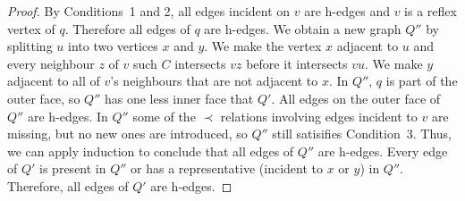 \documentclass{patmorin}
\begin{document}
\begin{proof}
   By Conditions~1 and 2, all edges incident on $v$ are h-edges and $v$
   is a reflex vertex of $q$. Therefore all edges of $q$ are h-edges.
   We obtain a new graph $Q''$ by splitting $u$ into two vertices $x$
   and $y$.  We make the vertex $x$ adjacent to $u$ and every neighbour
   $z$ of $v$ such $C$ intersects $vz$ before it intersects $vu$.  We make
   $y$ adjacent to all of $v$'s neighbours that are not adjacent to $x$.
   In $Q''$, $q$ is part of the outer face, so $Q''$ has one less inner
   face that $Q'$.  All edges on the outer face of $Q''$ are h-edges.
   In $Q''$ some of the $\prec$ relations involving edges incident
   to $v$ are missing, but no new ones are introduced, so $Q''$ still
   satisifies Condition~3.  Thus, we can apply induction to conclude
   that all edges of $Q''$ are h-edges.  Every edge of $Q'$ is present
   in $Q''$ or has a representative (incident to $x$ or $y$) in $Q''$.
   Therefore, all edges of $Q'$ are h-edges.
\end{proof}
%
%
%
\end{document}
